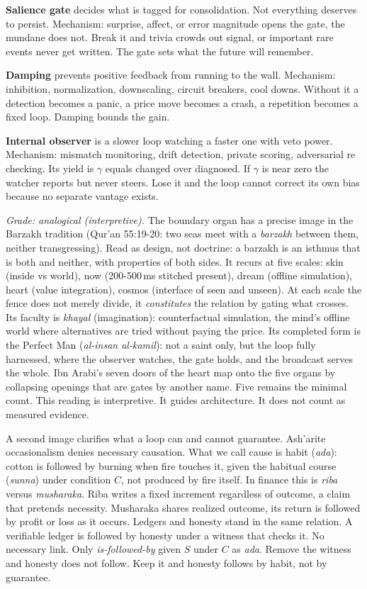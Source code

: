 \documentclass[11pt]{article}
\begin{document}
\textbf{Salience gate} decides what is tagged for consolidation. Not everything deserves to persist. Mechanism: surprise, affect, or error magnitude opens the gate, the mundane does not. Break it and trivia crowds out signal, or important rare events never get written. The gate sets what the future will remember.

\textbf{Damping} prevents positive feedback from running to the wall. Mechanism: inhibition, normalization, downscaling, circuit breakers, cool downs. Without it a detection becomes a panic, a price move becomes a crash, a repetition becomes a fixed loop. Damping bounds the gain.

\textbf{Internal observer} is a slower loop watching a faster one with veto power. Mechanism: mismatch monitoring, drift detection, private scoring, adversarial re checking. Its yield is $\gamma$ equals changed over diagnosed. If $\gamma$ is near zero the watcher reports but never steers. Lose it and the loop cannot correct its own bias because no separate vantage exists.

\textit{Grade: analogical (interpretive).} The boundary organ has a precise image in the Barzakh tradition (Qur'an 55:19-20: two seas meet with a \emph{barzakh} between them, neither transgressing). Read as design, not doctrine: a barzakh is an isthmus that is both and neither, with properties of both sides. It recurs at five scales: skin (inside vs world), now (200-500\,ms stitched present), dream (offline simulation), heart (value integration), cosmos (interface of seen and unseen). At each scale the fence does not merely divide, it \emph{constitutes} the relation by gating what crosses. Its faculty is \emph{khayal} (imagination): counterfactual simulation, the mind's offline world where alternatives are tried without paying the price. Its completed form is the Perfect Man (\emph{al-insan al-kamil}): not a saint only, but the loop fully harnessed, where the observer watches, the gate holds, and the broadcast serves the whole. Ibn Arabi's seven doors of the heart map onto the five organs by collapsing openings that are gates by another name. Five remains the minimal count. This reading is interpretive. It guides architecture. It does not count as measured evidence.

A second image clarifies what a loop can and cannot guarantee. Ash'arite occasionalism denies necessary causation. What we call cause is habit (\emph{ada}): cotton is followed by burning when fire touches it, given the habitual course (\emph{sunna}) under condition $C$, not produced by fire itself. In finance this is \emph{riba} versus \emph{musharaka}. Riba writes a fixed increment regardless of outcome, a claim that pretends necessity. Musharaka shares realized outcome, its return is followed by profit or loss as it occurs. Ledgers and honesty stand in the same relation. A verifiable ledger is followed by honesty under a witness that checks it. No necessary link. Only \emph{is-followed-by} given $S$ under $C$ as \emph{ada}. Remove the witness and honesty does not follow. Keep it and honesty follows by habit, not by guarantee.
\end{document}
